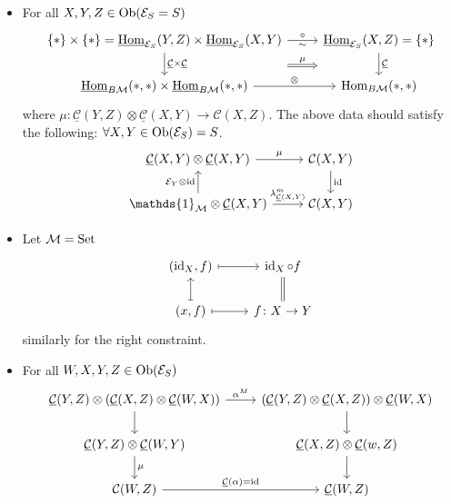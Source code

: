 \begin{exmp}
\begin{itemize}
		\item 
		For all $ X , Y , Z \in \operatorname{Ob} ( \mathcal{ E }_S = S ) $
		\[
		\begin{tikzcd}
			\{ * \} \times \{ * \} = \underline{\Hom}_{\mathcal{ E }_S } ( Y , Z ) \times \underline{ \Hom }_{ \mathcal{ E }_S } ( X , Y )
			\ar[r, "\sim"', "\circ"]
			\ar[r,shift right =2em, Rightarrow, "\mu"]
			\ar[d, "\underline{ \mathcal{ C } } \times \underline{ \mathcal{ C } }"]
			&
			\underline{\Hom}_{\mathcal{E}_S}( X , Z ) = \{ * \}
			\ar[d, "\underline{\mathcal{C}}"]
			\\
			\underline{\Hom}_{B\mathcal{ M } } ( * , * ) \times
			\underline{\Hom}_{B \mathcal{ M } } ( * , * )
			\ar[r, "\otimes"]
			&
			\Hom_{B\mathcal{ M } } ( * , * )
		\end{tikzcd}
		\]
		where $ \mu \colon \underline{\mathcal{ C }}( Y , Z ) \otimes \underline{ \mathcal{ C } } ( X , Y ) \to \mathcal{ C } ( X , Z )$.
		The above data should satisfy the following:
		$ \forall X , Y \in \operatorname{Ob} ( \mathcal{ E }_S ) = S $.
		\[
		\begin{tikzcd}
			\underline{\mathcal{ C } } ( X , Y ) \otimes \underline{\mathcal{ C } } ( X , Y ) 
			\ar[r, "\mu"]
			&
			\mathcal{ C } ( X , Y )
			\ar[d, " \id "]
			\\
			\mathds{ 1 }_{ \mathcal{ M } } \otimes \underline{ \mathcal{ C } } ( X , Y )
			\ar[r, " \lambda^m_{ \underline{\mathcal{ C }} ( X , Y )} "]
			\ar[u, " \mathcal{ E }_Y \otimes \id"]
			&
			\mathcal{C} ( X , Y )
		\end{tikzcd}
		\]
		
		\item 
		Let $\mathcal{ M } = \operatorname{Set}$
		\[
		\begin{tikzcd}
			( \id_X , f )
			\ar[r, mapsto]
			&
			\id_X \circ f 
			\ar[d, equal]
			\\
			( x , f )
			\ar[u , mapsto]
			\ar[r, mapsto]
			&
			f \colon X \to Y
		\end{tikzcd}
		\]
		similarly for the right constraint.
		
		\item 
		For all $ W , X , Y , Z \in \operatorname{Ob} ( \mathcal{E }_S ) $
		\[
		\begin{tikzcd}
			\underline{\mathcal{ C } } ( Y , Z ) \otimes  ( \underline{\mathcal{ C } } ( X , Z ) \otimes \underline{\mathcal{ C } } ( W , X ) )
			\ar[d]
			\ar[r, " \alpha^M " ]
			&
			( \underline{\mathcal{ C } } ( Y , Z ) \otimes   \underline{\mathcal{ C } } ( X , Z ) ) \otimes \underline{\mathcal{ C } } ( W , X ) 
			\ar[d]
			\\
			\underline{ \mathcal{ C } } ( Y , Z ) \otimes 
			\underline{ \mathcal{ C } } ( W , Y )
			\ar[d, " \mu" ]
			&
			\underline{\mathcal{ C } } ( X , Z ) \otimes
			\underline{\mathcal{ C } } ( w , Z )
			\ar[d]
			\\
			\mathcal{ C } ( W , Z )
			\ar[r, " \underline{\mathcal{ C}} ( \alpha ) = \id "]
			&
			\underline{\mathcal{ C } } ( W , Z )
		\end{tikzcd}
		\] 
	\end{itemize}
\end{exmp}

